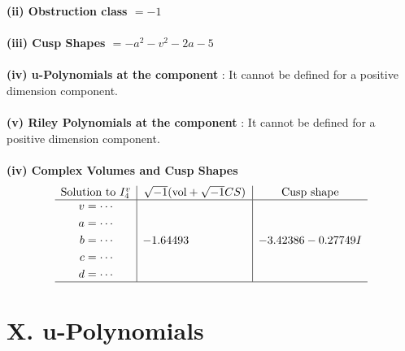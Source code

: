 \documentclass[1p]{elsarticle_modified}
\theoremstyle{definition}
\newcommand{\I}{\sqrt{-1}}
\begin{document}
\flushleft \textbf{(ii) Obstruction class $= -1$}\\~\\
\flushleft \textbf{(iii) Cusp Shapes $= - a^2- v^2-2 a-5$}\\~\\
\flushleft \textbf{(iv) u-Polynomials at the component} : It cannot be defined for a positive dimension component.\\~\\
\flushleft \textbf{(v) Riley Polynomials at the component} : It cannot be defined for a positive dimension component.\\~\\
\newpage\flushleft \textbf{(iv) Complex Volumes and Cusp Shapes}
$$\begin{array}{c|c|c} 
\text{Solution to }I^v_{4}& \I (\text{vol} + \sqrt{-1}CS) & \text{Cusp shape}\\
 \hline 
\begin{aligned}
v &= \cdots \\
a &= \cdots \\
b &= \cdots \\
c &= \cdots \\
d &= \cdots\end{aligned}
 & -1.64493\phantom{ +0.000000I} & -3.42386 - 0.27749 I\\
 \hline 
 \end{array}
$$
\newpage\renewcommand{\arraystretch}{1}
\centering \section*{ X. u-Polynomials}
\end{document}
